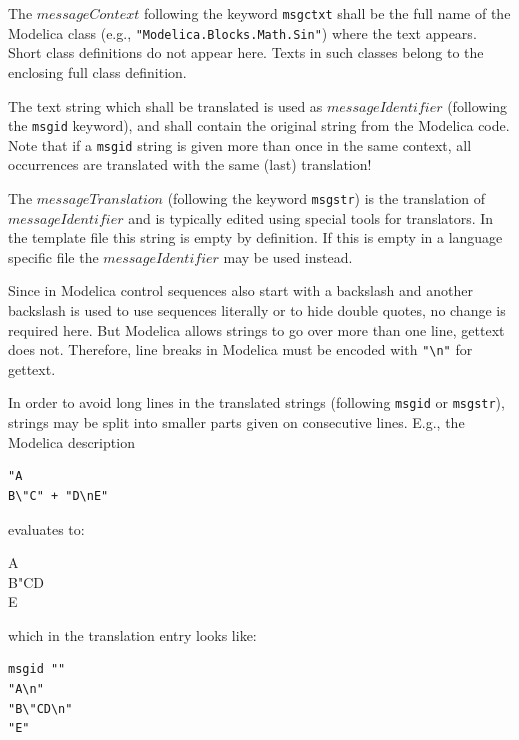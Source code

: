 The $\mathit{messageContext}$ following the keyword \lstinline!msgctxt! shall be the full name of the Modelica class (e.g., \lstinline!"Modelica.Blocks.Math.Sin"!) where the text appears.
Short class definitions do not appear here.
Texts in such classes belong to the enclosing full class definition.

The text string which shall be translated is used as $\mathit{messageIdentifier}$ (following the \lstinline!msgid! keyword), and shall contain the original string from the Modelica code.
Note that if a \lstinline!msgid! string is given more than once in the same context, all occurrences are translated with the same (last) translation!

\begin{nonnormative}
The $\mathit{messageTranslation}$ (following the keyword \lstinline!msgstr!) is the translation of $\mathit{messageIdentifier}$ and is typically edited using special tools for translators.
In the template file this string is empty by definition.
If this is empty in a language specific file the $\mathit{messageIdentifier}$ may be used instead.
\end{nonnormative}

\begin{nonnormative}
Since in Modelica control sequences also start with a backslash and another backslash is used to use sequences literally or to hide double quotes, no change is required here.
But Modelica allows strings to go over more than one line, gettext does not.
Therefore, line breaks in Modelica must be encoded with \lstinline!"\n"! for gettext.

In order to avoid long lines in the translated strings (following \lstinline!msgid! or \lstinline!msgstr!), strings may be split into smaller parts given on consecutive lines.
E.g., the Modelica description
\begin{lstlisting}
"A
B\"C" + "D\nE"
\end{lstlisting}
evaluates to:\par
\hspace{1em}\begin{minipage}{0.5\textwidth}
A\\
B"CD\\
E
\end{minipage}\par
which in the translation entry looks like:
\begin{lstlisting}
msgid ""
"A\n"
"B\"CD\n"
"E"
\end{lstlisting}
\end{nonnormative}

